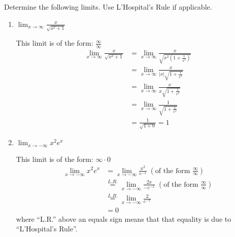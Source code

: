 \documentclass[nooutcomes]{ximera}
\begin{document}
\begin{problem}
  Determine the following limits.
  Use L'Hospital's Rule if applicable.
  \begin{enumerate}
  
  \item  $\lim_{x \to \infty} \frac{x}{\sqrt{x^2 + 1}}  $

    \begin{freeResponse}
    
    This limit is of the form:  $\frac{\infty}{\infty}$
      \begin{align*}
        \lim_{x \to \infty} \frac{x}{\sqrt{x^2 + 1}} &= \lim_{x \to \infty} \frac{x}{\sqrt{x^2 \left(1 + \frac{1}{x^2} \right)}} \\
                                                     &=  \lim_{x \to \infty} \frac{x}{|x| \sqrt{1 + \frac{1}{x^2} }} \\
                                                     &=  \lim_{x \to \infty} \frac{x}{x \sqrt{1 + \frac{1}{x^2} }} \\
                                                     &=  \lim_{x \to \infty} \frac{1}{\sqrt{1 + \frac{1}{x^2} }} \\
                                                     &= \frac{1}{\sqrt{1 + 0}} = 1
      \end{align*}
    \end{freeResponse}
    
    
  \item  $\lim_{x \to - \infty} x^2 e^x $
    \begin{freeResponse}
    This limit is of the form: $\infty \cdot 0$
      \begin{align*}
        \lim_{x \to - \infty} x^2 e^x &= \lim_{x \to - \infty} \frac{x^2}{ e^{-x}} \; \left( \text{of the form } \frac{\infty}{\infty} \right) \\
                                      &\stackrel{L.R.}{=}  \lim_{x \to - \infty} \frac{2x}{- e^{-x}} \; \left( \text{of the form } \frac{\infty}{\infty} \right) \\
                                      &\stackrel{L.R.}{=}  \lim_{x \to - \infty} \frac{2}{ e^{-x}}  \\
                                      &= 0
      \end{align*}
      where ``L.R.'' above an equals sign means that that equality is due to ``L'Hospital's Rule''.  
    \end{freeResponse}
    

\end{enumerate}
\end{problem}
\end{document}
